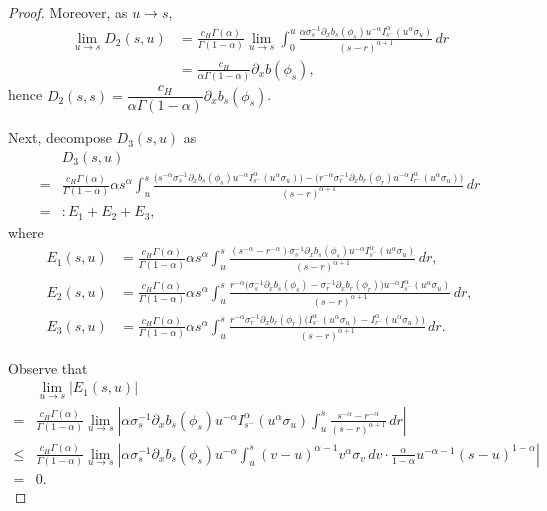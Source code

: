 \documentclass[10pt,a4paper]{amsart}
\begin{document}
\begin{proof}
Moreover, as $u\to s$,
\begin{align*}
	\lim_{u\to s}D_2(s,u)
	&= \frac{c_H\Gamma(\alpha)}{\Gamma(1-\alpha)}\lim_{u\to s}\int_0^u \frac{\alpha \sigma_s^{-1}\partial_x b_s(\phi_s)u^{-\alpha}I_{s^-}^\alpha (u^\alpha \sigma_u)}{(s-r)^{\alpha+1}}\,dr\\
	&= \frac{c_H}{\alpha\Gamma(1-\alpha)}\partial_x b(\phi_s),
\end{align*}
hence $D_2(s,s)=\dfrac{c_H}{\alpha\Gamma(1-\alpha)}\partial_x b_s
(\phi_s)$.

Next, decompose $D_3(s,u)$ as
\begin{align*}
	& D_3(s,u)\\ 
    =& \frac{c_H\Gamma(\alpha)}{\Gamma(1-\alpha)} \alpha s^\alpha\int_u^s \frac{ 
	\big(s^{-\alpha}\sigma_s^{-1}\partial_x b_s(\phi_s)u^{-\alpha}I_{s^-}^\alpha (u^\alpha\sigma_u)\big) - \big(r^{-\alpha}\sigma_r^{-1}\partial_x b_r(\phi_r)u^{-\alpha}I_{r^-}^\alpha (u^\alpha\sigma_u)\big)}
		{(s-r)^{\alpha+1}}\,dr \\
		=&: E_1+E_2+E_3,
\end{align*}
where
\begin{align*}
	E_1(s,u)&=\frac{c_H\Gamma(\alpha)}{\Gamma(1-\alpha)} \alpha s^\alpha\int_u^s \frac{ (s^{-\alpha}- r^{-\alpha})\sigma_s^{-1}\partial_x b_s(\phi_s)u^{-\alpha}I_{s^-}^\alpha (u^\alpha \sigma_u)}
		{(s-r)^{\alpha+1}}\,dr,\\
    E_2(s,u)&=\frac{c_H\Gamma(\alpha)}{\Gamma(1-\alpha)} \alpha s^\alpha\int_u^s \frac{ r^{-\alpha}\big(\sigma_s^{-1}\partial_x b_s(\phi_s)-\sigma_r^{-1}\partial_x b_r(\phi_r)\big)u^{-\alpha}I_{s^-}^\alpha (u^\alpha \sigma_u)}
		{(s-r)^{\alpha+1}}\,dr,\\
    E_3(s,u)&=\frac{c_H\Gamma(\alpha)}{\Gamma(1-\alpha)} \alpha s^\alpha\int_u^s \frac{ r^{-\alpha}\sigma_r^{-1}\partial_x b_r(\phi_r)\big(I_{s^-}^\alpha (u^\alpha\sigma_u)- I_{r^-}^\alpha (u^\alpha\sigma_u)\big)}
		{(s-r)^{\alpha+1}}\,dr.
\end{align*}

Observe that
\begin{align*}
    &\lim_{u\to s} \left|E_1(s,u)\right|\\
    =&\frac{c_H\Gamma(\alpha)}{\Gamma(1-\alpha)}\lim_{u\to s}\left| \alpha  \sigma_s^{-1}\partial_x b_s(\phi_s)u^{-\alpha}I_{s^-}^\alpha (u^\alpha\sigma_u)\int_u^s \frac{ s^{-\alpha}- r^{-\alpha}}{(s-r)^{\alpha+1}}\,dr\right|\\
    \leq & \frac{c_H\Gamma(\alpha)}{\Gamma(1-\alpha)}\lim_{u\to s} \left|\alpha  \sigma_s^{-1}\partial_x b_s(\phi_s)u^{-\alpha}\int_u^s (v-u)^{\alpha-1}v^\alpha\sigma_v\,dv\cdot \frac{\alpha}{1-\alpha}u^{-\alpha-1}(s-u)^{1-\alpha}\right| \\
   =&0.
\end{align*}


\end{proof}
\end{document}

